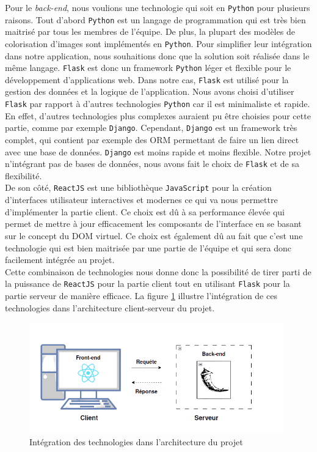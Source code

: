 \documentclass{article}
\begin{document}
Pour le \textit{back-end}, nous voulions une technologie qui soit en \texttt{Python} pour plusieurs raisons. Tout d'abord \texttt{Python} est un langage de programmation qui
est très bien maitrisé par tous les membres de l'équipe. De plus, la plupart des modèles de colorisation d'images sont implémentés en \texttt{Python}. Pour simplifier leur intégration
dans notre application, nous souhaitions donc que la solution soit réalisée dans le même langage.
\texttt{Flask} est donc un framework \texttt{Python} léger et flexible pour le développement d'applications web. Dans notre cas, \texttt{Flask} est utilisé  pour la gestion des données et la logique de l'application. 
Nous avons choisi d'utiliser \texttt{Flask} par rapport à d'autres technologies \texttt{Python} car il est minimaliste et rapide. En effet, d'autres technologies plus complexes auraient pu être choisies pour 
cette partie, comme par exemple \texttt{Django}. Cependant, \texttt{Django} est un framework très complet, qui contient par exemple des ORM permettant de faire un lien direct avec une base de données.
\texttt{Django} est moins rapide et moins flexible. Notre projet n'intégrant pas de bases de données, nous avons fait le choix de \texttt{Flask} et de sa flexibilité.\\

De son côté, \texttt{ReactJS} est une bibliothèque \texttt{JavaScript} pour la création d'interfaces utilisateur interactives et modernes ce qui va nous permettre d’implémenter la partie client.
Ce choix est dû à sa performance élevée qui permet de mettre à jour efficacement les composants de l’interface en se basant sur le concept du DOM virtuel.
Ce choix est également dû au fait que c'est une technologie qui est bien maitrisée par une partie de l'équipe et qui sera donc facilement intégrée au projet. \\

Cette combinaison de technologies nous donne donc la possibilité de tirer parti de la puissance de \texttt{ReactJS}  pour la partie client tout en utilisant \texttt{Flask} pour la partie serveur de manière efficace.
La figure \ref{fig:outils} illustre l'intégration de ces technologies dans l'architecture client-serveur du projet.

\begin{figure}[htp]
  \centering
  \includegraphics[width=11cm]{outils.png}
  \caption{Intégration des technologies dans l'architecture du projet}
  \label{fig:outils}
\end{figure}
\end{document}
